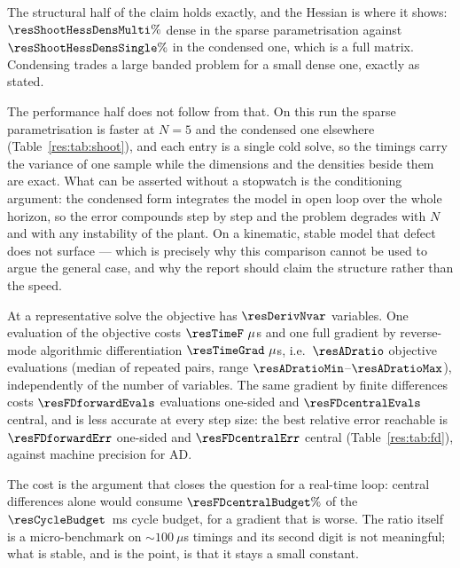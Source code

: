 The structural half of the claim holds exactly, and the Hessian is where it shows: $\resShootHessDensMulti\%$ dense in the sparse parametrisation against $\resShootHessDensSingle\%$ in the condensed one, which is a full matrix. Condensing trades a large banded problem for a small dense one, exactly as stated.

The performance half does not follow from that. On this run the sparse parametrisation is faster at $N=5$ and the condensed one elsewhere (Table~\ref{res:tab:shoot}), and each entry is a single cold solve, so the timings carry the variance of one sample while the dimensions and the densities beside them are exact. What can be asserted without a stopwatch is the conditioning argument: the condensed form integrates the model in open loop over the whole horizon, so the error compounds step by step and the problem degrades with $N$ and with any instability of the plant. On a kinematic, stable model that defect does not surface --- which is precisely why this comparison cannot be used to argue the general case, and why the report should claim the structure rather than the speed.


\label{res:ad}


At a representative solve the objective has $\resDerivNvar$ variables. One evaluation of the objective costs $\resTimeF~\mu$s and one full gradient by reverse-mode algorithmic differentiation $\resTimeGrad~\mu$s, i.e.\ $\resADratio$ objective evaluations (median of repeated pairs, range $\resADratioMin$--$\resADratioMax$), independently of the number of variables. The same gradient by finite differences costs $\resFDforwardEvals$ evaluations one-sided and $\resFDcentralEvals$ central, and is less accurate at every step size: the best relative error reachable is $\resFDforwardErr$ one-sided and $\resFDcentralErr$ central (Table~\ref{res:tab:fd}), against machine precision for AD.

The cost is the argument that closes the question for a real-time loop: central differences alone would consume $\resFDcentralBudget\%$ of the $\resCycleBudget$~ms cycle budget, for a gradient that is worse. The ratio itself is a micro-benchmark on $\sim100~\mu$s timings and its second digit is not meaningful; what is stable, and is the point, is that it stays a small constant.

